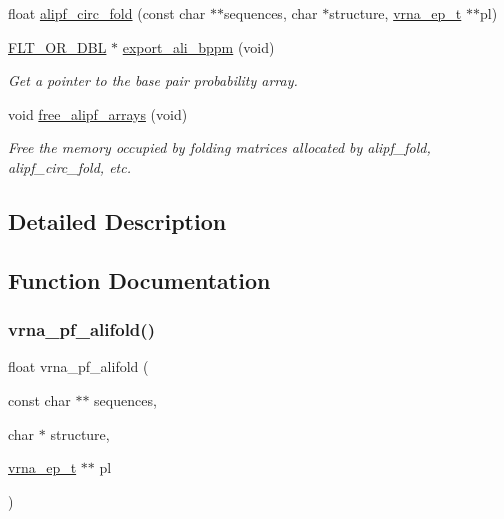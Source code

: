 \begin{DoxyCompactItemize}
float \hyperlink{group__consensus__pf__fold_ga604a42ad64178279551ad3e4def3d603}{alipf\+\_\+circ\+\_\+fold} (const char $\ast$$\ast$sequences, char $\ast$structure, \hyperlink{group__struct__utils_gab9ac98ab55ded9fb90043b024b915aca}{vrna\+\_\+ep\+\_\+t} $\ast$$\ast$pl)
\item 
\hyperlink{group__data__structures_ga31125aeace516926bf7f251f759b6126}{F\+L\+T\+\_\+\+O\+R\+\_\+\+D\+BL} $\ast$ \hyperlink{group__consensus__pf__fold_ga11b6ab8bd9be1821fea352b190a01cab}{export\+\_\+ali\+\_\+bppm} (void)
\begin{DoxyCompactList}\small\item\em Get a pointer to the base pair probability array. \end{DoxyCompactList}\item 
void \hyperlink{group__consensus__pf__fold_ga0c0498f35686e26b38ee460d3db1a661}{free\+\_\+alipf\+\_\+arrays} (void)
\begin{DoxyCompactList}\small\item\em Free the memory occupied by folding matrices allocated by alipf\+\_\+fold, alipf\+\_\+circ\+\_\+fold, etc. \end{DoxyCompactList}\end{DoxyCompactItemize}


\subsection{Detailed Description}


\subsection{Function Documentation}
\mbox{\label{group__consensus__pf__fold_ga374e31a0f326b2c5da5b84e143a63f38}} 
\subsubsection{\texorpdfstring{vrna\+\_\+pf\+\_\+alifold()}{vrna\_pf\_alifold()}}
{\footnotesize\ttfamily float vrna\+\_\+pf\+\_\+alifold (\begin{DoxyParamCaption}\item[{const char $\ast$$\ast$}]{sequences,  }\item[{char $\ast$}]{structure,  }\item[{\hyperlink{group__struct__utils_gab9ac98ab55ded9fb90043b024b915aca}{vrna\+\_\+ep\+\_\+t} $\ast$$\ast$}]{pl }\end{DoxyParamCaption})}



